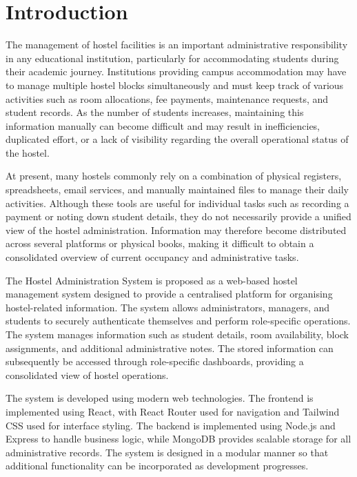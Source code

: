 \chapter{Introduction}

The management of hostel facilities is an important administrative responsibility in any educational institution, particularly for accommodating students during their academic journey. Institutions providing campus accommodation may have to manage multiple hostel blocks simultaneously and must keep track of various activities such as room allocations, fee payments, maintenance requests, and student records. As the number of students increases, maintaining this information manually can become difficult and may result in inefficiencies, duplicated effort, or a lack of visibility regarding the overall operational status of the hostel.

At present, many hostels commonly rely on a combination of physical registers, spreadsheets, email services, and manually maintained files to manage their daily activities. Although these tools are useful for individual tasks such as recording a payment or noting down student details, they do not necessarily provide a unified view of the hostel administration. Information may therefore become distributed across several platforms or physical books, making it difficult to obtain a consolidated overview of current occupancy and administrative tasks.

The Hostel Administration System is proposed as a web-based hostel management system designed to provide a centralised platform for organising hostel-related information. The system allows administrators, managers, and students to securely authenticate themselves and perform role-specific operations. The system manages information such as student details, room availability, block assignments, and additional administrative notes. The stored information can subsequently be accessed through role-specific dashboards, providing a consolidated view of hostel operations.

The system is developed using modern web technologies. The frontend is implemented using React, with React Router used for navigation and Tailwind CSS used for interface styling. The backend is implemented using Node.js and Express to handle business logic, while MongoDB provides scalable storage for all administrative records. The system is designed in a modular manner so that additional functionality can be incorporated as development progresses.

